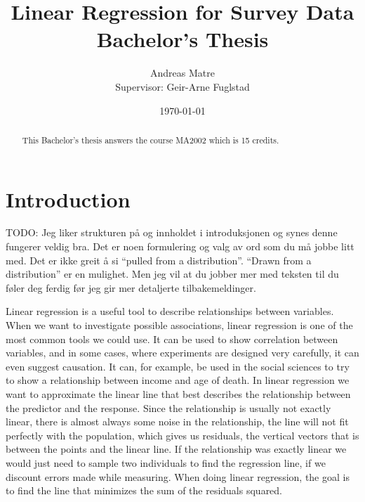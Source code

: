 \documentclass{article}
\title{Linear Regression for Survey Data \\
{\Large Bachelor's Thesis}}
\author{Andreas Matre \\
Supervisor: Geir-Arne Fuglstad}
\date{\today}
\begin{document}
\newtheorem{definition}{Definition}
\newtheorem{theorem}{Theorem}
\newtheorem{example}{Example}


\maketitle

\begin{abstract}
  This Bachelor's thesis answers the course MA2002 which is 15 credits.
\end{abstract}

\newpage

\tableofcontents

\newpage

\section{Introduction}

TODO: Jeg liker strukturen på og innholdet i introduksjonen og synes denne fungerer veldig bra. Det er noen formulering og valg av ord som du må jobbe litt med. Det er ikke greit å si “pulled from a distribution”. “Drawn from a distribution” er en mulighet. Men jeg vil at du jobber mer med teksten til du føler deg ferdig før jeg gir mer detaljerte tilbakemeldinger.

Linear regression is a useful tool to describe relationships between variables.
When we want to investigate possible associations, linear regression
is one of the most common tools we could use. It can be used to show correlation between
variables, and in some cases, where experiments are designed very carefully, it can even suggest causation.
It can, for example, be used in the social sciences to try to show a relationship
between income and age of death. In linear regression we want to approximate the
linear line that best describes the relationship between the predictor and the
response. Since the relationship is usually not exactly linear, there is almost
always some noise in the relationship, the line will not
fit perfectly with the population, which gives us residuals, the vertical
vectors that is between the points and the linear line. If the relationship was
exactly linear we would just need to sample two individuals to find the
regression line, if we discount errors made while measuring. When doing linear
regression, the goal is to find the line that minimizes the sum of the residuals squared.
\end{document}
